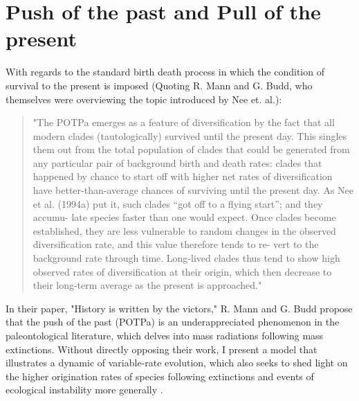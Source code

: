 \section{Push of the past and Pull of the present}


With regards to the standard birth death process in which the condition of survival to the present is imposed (Quoting R.  Mann and G. Budd, who themselves were overviewing the topic introduced by Nee et.  al.):


\begin{quotation}
\noindent
"The POTPa emerges as a feature of diversification by the fact
that all modern clades (tautologically) survived until the present
day. This singles them out from the total population of clades
that could be generated from any particular pair of background
birth and death rates: clades that happened by chance to start off
with higher net rates of diversification have better-than-average
chances of surviving until the present day. As Nee et al. (1994a)
put it, such clades “got off to a flying start”; and they accumu-
late species faster than one would expect. Once clades become
established, they are less vulnerable to random changes in the
observed diversification rate, and this value therefore tends to re-
vert to the background rate through time. Long-lived clades thus
tend to show high observed rates of diversification at their origin,
which then decrease to their long-term average as the present is
approached."
\end{quotation}

\noindent
In their paper, "History is written by the victors," R. Mann and G. Budd propose that the push of the past (POTPa) is an underappreciated phenomenon in the paleontological literature, which delves into mass radiations following mass extinctions.
Without directly opposing their work, I present a model that illustrates a dynamic of variable-rate evolution, which also seeks to shed light on the higher origination rates of species following extinctions and events of ecological instability more generally \cite{bak1991self} \cite{fisher1929genetical}\cite{budd2018history}.
